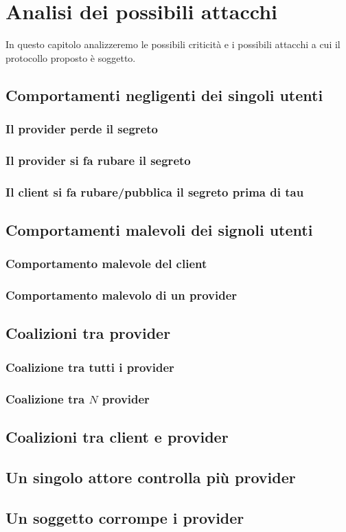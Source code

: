 \chapter{Analisi dei possibili attacchi}
\label{chap:analisi-attacchi}

In questo capitolo analizzeremo le possibili criticità e i
possibili attacchi a cui il protocollo proposto
è soggetto.

\section{Comportamenti negligenti dei singoli utenti}
\subsection{Il provider perde il segreto}
\subsection{Il provider si fa rubare il segreto}
\subsection{Il client si fa rubare/pubblica il segreto prima di tau}


\section{Comportamenti malevoli dei signoli utenti}
\subsection{Comportamento malevole del client}

\subsection{Comportamento malevolo di un provider}


\section{Coalizioni tra provider}
\subsection{Coalizione tra tutti i provider}
\subsection{Coalizione tra $ N $ provider}

\section{Coalizioni tra client e provider}

\section{Un singolo attore controlla più provider}

\section{Un soggetto corrompe i provider}